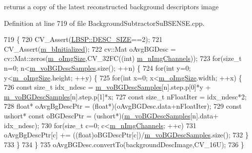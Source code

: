 returns a copy of the latest reconstructed background descriptors image 



Definition at line 719 of file Background\+Subtractor\+Su\+B\+S\+E\+N\+S\+E.\+cpp.


\begin{DoxyCode}
719                                                                                                         \{
720     CV\_Assert(\mbox{\hyperlink{class_l_b_s_p_a11167130ddc713921e5bbb0b628d5f74}{LBSP::DESC\_SIZE}}==2);
721     CV\_Assert(\mbox{\hyperlink{class_background_subtractor_l_b_s_p_a55cea104a0924fd50d5bed0912828a7e}{m\_bInitialized}});
722     cv::Mat oAvgBGDesc = cv::Mat::zeros(\mbox{\hyperlink{class_background_subtractor_l_b_s_p_a732d5e6ae35fb0e858cadb3af5ce08a2}{m\_oImgSize}},CV\_32FC((\textcolor{keywordtype}{int})
      \mbox{\hyperlink{class_background_subtractor_l_b_s_p_ab3467ebee2c5d1249061ccd704cc0584}{m\_nImgChannels}}));
723     \textcolor{keywordflow}{for}(\textcolor{keywordtype}{size\_t} n=0; n<\mbox{\hyperlink{class_background_subtractor_su_b_s_e_n_s_e_a422cc2f2a25c07efca02087bd6fe3d6d}{m\_voBGDescSamples}}.size(); ++n) \{
724         \textcolor{keywordflow}{for}(\textcolor{keywordtype}{int} y=0; y<\mbox{\hyperlink{class_background_subtractor_l_b_s_p_a732d5e6ae35fb0e858cadb3af5ce08a2}{m\_oImgSize}}.height; ++y) \{
725             \textcolor{keywordflow}{for}(\textcolor{keywordtype}{int} x=0; x<\mbox{\hyperlink{class_background_subtractor_l_b_s_p_a732d5e6ae35fb0e858cadb3af5ce08a2}{m\_oImgSize}}.width; ++x) \{
726                 \textcolor{keyword}{const} \textcolor{keywordtype}{size\_t} idx\_ndesc = \mbox{\hyperlink{class_background_subtractor_su_b_s_e_n_s_e_a422cc2f2a25c07efca02087bd6fe3d6d}{m\_voBGDescSamples}}[n].step.p[0]*y + 
      \mbox{\hyperlink{class_background_subtractor_su_b_s_e_n_s_e_a422cc2f2a25c07efca02087bd6fe3d6d}{m\_voBGDescSamples}}[n].step.p[1]*x;
727                 \textcolor{keyword}{const} \textcolor{keywordtype}{size\_t} nFloatIter = idx\_ndesc*2;
728                 \textcolor{keywordtype}{float}* oAvgBgDescPtr = (\textcolor{keywordtype}{float}*)(oAvgBGDesc.data+nFloatIter);
729                 \textcolor{keyword}{const} ushort* \textcolor{keyword}{const} oBGDescPtr = (ushort*)(\mbox{\hyperlink{class_background_subtractor_su_b_s_e_n_s_e_a422cc2f2a25c07efca02087bd6fe3d6d}{m\_voBGDescSamples}}[n].data+
      idx\_ndesc);
730                 \textcolor{keywordflow}{for}(\textcolor{keywordtype}{size\_t} c=0; c<\mbox{\hyperlink{class_background_subtractor_l_b_s_p_ab3467ebee2c5d1249061ccd704cc0584}{m\_nImgChannels}}; ++c)
731                     oAvgBgDescPtr[c] += ((\textcolor{keywordtype}{float})oBGDescPtr[c])/\mbox{\hyperlink{class_background_subtractor_su_b_s_e_n_s_e_a422cc2f2a25c07efca02087bd6fe3d6d}{m\_voBGDescSamples}}.size();
732             \}
733         \}
734     \}
735     oAvgBGDesc.convertTo(backgroundDescImage,CV\_16U);
736 \}
\end{DoxyCode}

